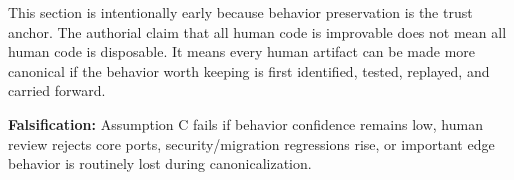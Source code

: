 This section is intentionally early because behavior preservation is the trust anchor. The authorial claim that all human code is improvable does not mean all human code is disposable. It means every human artifact can be made more canonical if the behavior worth keeping is first identified, tested, replayed, and carried forward.

\textbf{Falsification:} Assumption C fails if behavior confidence remains low, human review rejects core ports, security/migration regressions rise, or important edge behavior is routinely lost during canonicalization.

